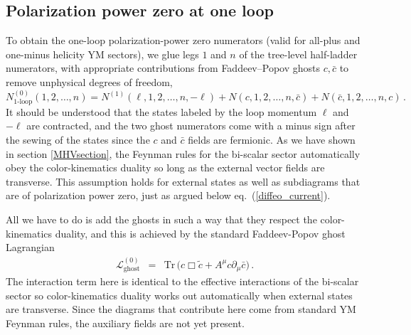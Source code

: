 \documentclass[11pt,a4paper]{article}
\def\eqn#1{eq.~(\ref{#1})}
\begin{document}
\subsection{Polarization power zero at one loop}
To obtain the one-loop polarization-power zero numerators (valid for all-plus and one-minus helicity YM sectors), we glue legs $1$ and $n$ of the tree-level half-ladder numerators, with appropriate contributions from Faddeev–Popov ghosts $c,\bar{c}$ to remove unphysical degrees of freedom,
\begin{equation}
    N^{(0)}_{\textrm{1-loop}}(1,2,\ldots,n) = N^{(1)}(\ell,1,2,\ldots,n,-\ell) + N(c,1,2,\ldots,n,\bar{c})+N(\bar{c},1,2,\ldots,n,{c}) \, .
\end{equation}
It should be understood that the states labeled by the loop momentum $\ell$ and $-\ell$ are contracted, and the two ghost numerators come with a minus sign after the sewing of the states since the $c$ and $\bar{c}$ fields are fermionic. 
As we have shown in section \ref{MHVsection}, the Feynman rules for the bi-scalar sector automatically obey the color-kinematics duality so long as the external vector fields are transverse. This assumption holds for external states as well as subdiagrams that are of polarization power zero, just as argued below \eqn{diffeo_current}. 

All we have to do is add the ghosts in such a way that they respect the color-kinematics duality, and this is achieved by the standard Faddeev-Popov ghost Lagrangian
\begin{eqnarray}
\mathcal{L}_\text{ghost}^{(0)} &=& \text{Tr} \, \Big(
c\Box \tilde{c} +A^\mu c\partial_\mu \bar{c} \Big) \, .
\end{eqnarray}
The interaction term here is identical to the effective interactions of the bi-scalar sector so color-kinematics duality works out automatically when external states are transverse. Since the diagrams that contribute here come from standard YM Feynman rules, the auxiliary fields are not yet present. 
\end{document}

